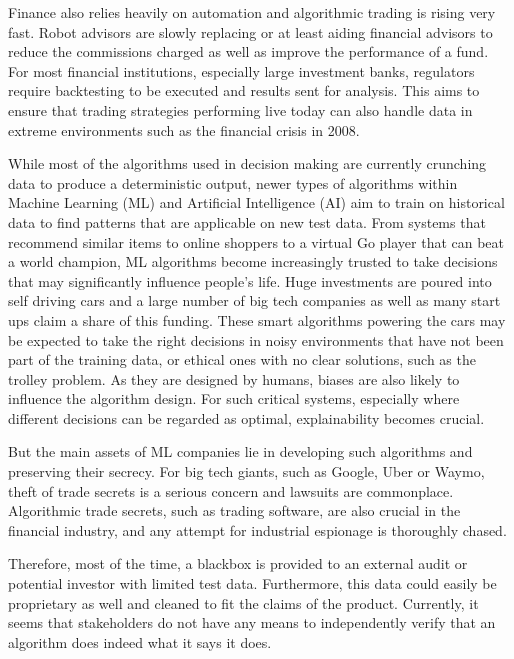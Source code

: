 \documentclass[proposal]{softeng}
\begin{document}
Finance also relies heavily on automation and algorithmic trading is rising very fast. Robot advisors are slowly replacing or at least aiding financial advisors to reduce the commissions charged as well as improve the performance of a fund\cite{robot}. For most financial institutions, especially large investment banks, regulators require backtesting to be executed and results sent for analysis\cite{backtesting}. This aims to ensure that trading strategies performing live today can also handle data in extreme environments such as the financial crisis in 2008.

While most of the algorithms used in decision making are currently crunching data to produce a deterministic output, newer types of algorithms within Machine Learning (ML) and Artificial Intelligence (AI) aim to train on historical data to find patterns that are applicable on new test data. From systems that recommend similar items to online shoppers to a virtual Go player that can beat a world champion\cite{alphago}, ML algorithms become increasingly trusted to take decisions that may significantly influence people's life. Huge investments are poured into self driving cars and a large number of big tech companies as well as many start ups\cite{autonomous} claim a share of this funding. These smart algorithms powering the cars may be expected to take the right decisions in noisy environments that have not been part of the training data, or ethical ones with no clear solutions, such as the trolley problem\cite{trolley}. As they are designed by humans, biases are also likely to influence the algorithm design. For such critical systems, especially where different decisions can be regarded as optimal, explainability becomes crucial.

But the main assets of ML companies lie in developing such algorithms and preserving their secrecy. For big tech giants, such as Google, Uber or Waymo, theft of trade secrets is a serious concern and lawsuits are commonplace\cite{stealuber,waymo}. Algorithmic trade secrets, such as trading software, are also crucial in the financial industry, and any attempt for industrial espionage is thoroughly chased\cite{jeopardy}.

Therefore, most of the time, a blackbox is provided to an external audit or potential investor with limited test data. Furthermore, this data could easily be proprietary as well and cleaned to fit the claims of the product. Currently, it seems that stakeholders do not have any means to independently verify that an algorithm does indeed what it says it does. 
\end{document}
